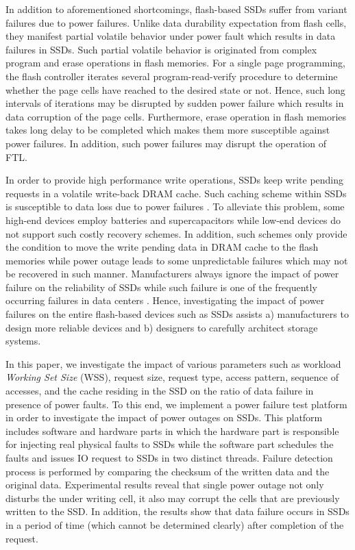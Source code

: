In addition to aforementioned shortcomings, flash-based SSDs suffer from variant failures due to power failures. 
Unlike data durability expectation from flash cells, they manifest partial volatile behavior under power fault which results in data failures in SSDs. Such partial volatile behavior is originated from complex program and erase operations in flash memories. For a single page programming, the flash controller iterates several program-read-verify procedure to determine whether the page cells have reached to the desired state or not. Hence, such long intervals of iterations may be disrupted by sudden power failure which results in data corruption of the page cells. Furthermore, erase operation in flash memories takes long delay to be completed which makes them more susceptible against power failures. 
In addition, such power failures may disrupt the operation of FTL. 

In order to provide high performance write operations, SSDs keep write pending requests in a volatile write-back DRAM cache. Such caching scheme within SSDs is susceptible to data loss due to power failures \cite{zheng2016reliability, zheng2013understanding}. 
To alleviate this problem, some high-end devices employ batteries and supercapacitors while low-end devices do not support such costly recovery schemes. In addition, such schemes only provide the condition to move the write pending data in DRAM cache to the flash memories while power outage leads to some unpredictable failures which may not be recovered in such manner.
Manufacturers always ignore the impact of power failure on the reliability of SSDs while such failure is one of the frequently occurring failures in data centers \cite{mcmillan2012amazon, claburnamazon, miller2012human, leach2012level}.
 Hence, investigating the impact of power failures on the entire flash-based devices such as SSDs assists a) manufacturers to design more reliable devices and b) designers to carefully architect storage systems. 

In this paper, we investigate the impact of various parameters such as workload \emph{Working Set Size} (WSS), request size, request type, access pattern, sequence of accesses, and the cache residing in the SSD on the ratio of data failure in presence of  power faults. To this end, we implement a power failure test platform in order to investigate the impact of power outages on SSDs. This platform includes software and hardware parts in which the hardware part is responsible for injecting real physical faults to SSDs while the software part schedules the faults and issues IO request to SSDs in two distinct threads. Failure detection process is performed by comparing the checksum of the written data and the original data. Experimental results reveal that single power outage not only disturbs the under writing cell, it also may corrupt the cells that are previously written to the SSD. In addition, the results show that data failure occurs in SSDs in a period of time (which cannot be determined clearly) after completion of the request.


